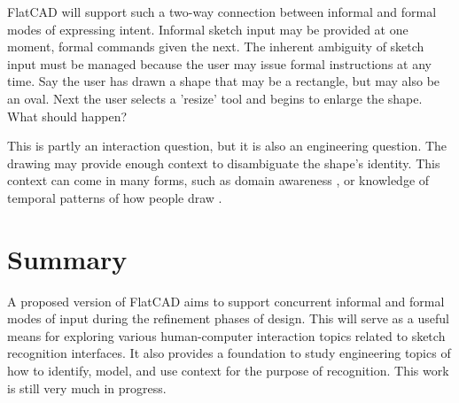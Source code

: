 \documentclass[times, 10pt, twocolumn]{article}
\begin{document}
FlatCAD will support such a two-way connection between informal and
formal modes of expressing intent. Informal sketch input may be
provided at one moment, formal commands given the next. The inherent
ambiguity of sketch input must be managed because the user may issue
formal instructions at any time. Say the user has drawn a shape that
may be a rectangle, but may also be an oval. Next the user selects a
'resize' tool and begins to enlarge the shape. What should happen?

This is partly an interaction question, but it is also an engineering
question. The drawing may provide enough context to disambiguate the
shape's identity. This context can come in many forms, such as domain
awareness \cite{alvarado-dynamic-bayes}, or knowledge of temporal
patterns of how people draw \cite{sezgin-multiscale-models}.

\section{Summary}

A proposed version of FlatCAD aims to support concurrent informal and
formal modes of input during the refinement phases of design. This
will serve as a useful means for exploring various human-computer
interaction topics related to sketch recognition interfaces. It also
provides a foundation to study engineering topics of how to identify,
model, and use context for the purpose of recognition. This work is
still very much in progress.




\end{document}
